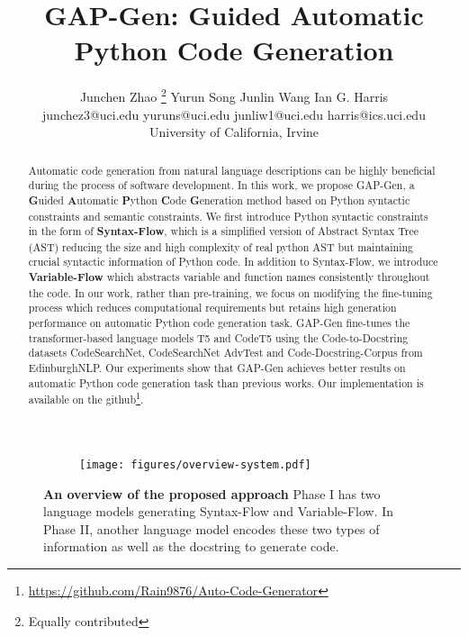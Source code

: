 \documentclass[11pt]{article}
\title{GAP-Gen: Guided Automatic Python Code Generation}
\author{Junchen Zhao \footnote[1]{Equally contributed\label{eq}} \hspace{30pt} Yurun Song \footnotemark
 \hspace{30pt}  Junlin Wang \hspace{30pt}  Ian G. Harris \\ 
\vspace{5pt}
junchez3@uci.edu\hspace{20pt} yuruns@uci.edu\hspace{20pt}  junliw1@uci.edu\hspace{20pt} harris@ics.uci.edu \\
\vspace{5pt}
        University of California, Irvine }
\renewcommand{\thefootnote}{\fnsymbol{footnote}}
\begin{document}
\maketitle 
{}
\renewcommand{\thefootnote}{\arabic{footnote}}
\setcounter{footnote}{0}
\begin{abstract}
Automatic code generation from natural language descriptions can be highly beneficial during the process of software development. In this work, we propose GAP-Gen, a \textbf{G}uided \textbf{A}utomatic \textbf{P}ython \textbf{C}ode \textbf{G}eneration method based on Python syntactic constraints and semantic constraints. We first introduce Python syntactic constraints in the form of \textbf{Syntax-Flow}, which is a simplified version of Abstract Syntax Tree (AST) reducing the size and high complexity of real python AST but maintaining crucial syntactic information of Python code. In addition to Syntax-Flow, we introduce \textbf{Variable-Flow}  which abstracts variable and function names consistently throughout the code. In our work, rather than pre-training, we focus on modifying the fine-tuning process which reduces computational requirements but retains high generation performance on automatic Python code generation task. GAP-Gen fine-tunes the transformer-based language models T5 and CodeT5 using the Code-to-Docstring datasets CodeSearchNet, CodeSearchNet AdvTest and Code-Docstring-Corpus from EdinburghNLP.  Our experiments show that GAP-Gen achieves better results on automatic Python code generation task than previous works. Our implementation is available on the github\footnote{\url{https://github.com/Rain9876/Auto-Code-Generator}}.




\end{abstract}


\begin{figure*}[ht] 
\centering
\begin{subfigure}{\textwidth}
\vspace{-50pt}
  {
    \texttt{[image: figures/overview-system.pdf]}
}
\label{fig:overview:orig}
  \end{subfigure}
     \vspace{-50pt}
  \caption{\textbf{An overview of the proposed approach} Phase I has two language models generating Syntax-Flow and Variable-Flow. In Phase II, another language model encodes these two types of information as well as the docstring to generate code.}
  \label{fig:overview}
\end{figure*}
\end{document}
